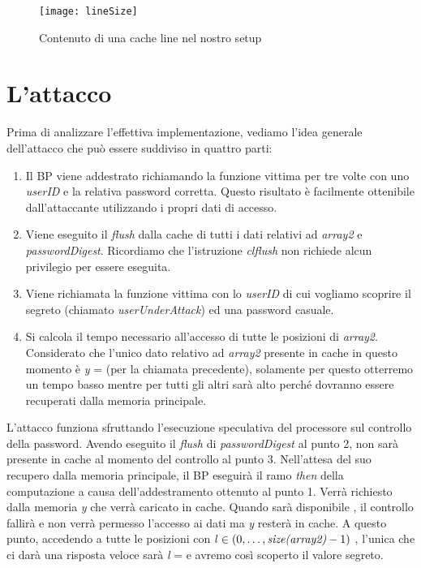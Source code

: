 		\begin{figure}
			\begin{center}
				\texttt{[image: lineSize]}
				\caption{Contenuto di una cache line nel nostro setup}
				\label{fig:lineSize}
			\end{center}
		\end{figure}
		
		\section{L'attacco}
			Prima di analizzare l'effettiva implementazione, vediamo l'idea generale dell'attacco che può essere suddiviso in quattro parti:
			
			\begin{enumerate}
				\item Il \ac{BP} viene addestrato richiamando la funzione vittima per tre volte con uno \emph{userID} e la relativa password corretta. Questo risultato è facilmente ottenibile dall'attaccante utilizzando i propri dati di accesso.
				\item Viene eseguito il \emph{flush} dalla cache di tutti i dati relativi ad \emph{array2} e \emph{passwordDigest}. Ricordiamo che l'istruzione \emph{clflush} non richiede alcun privilegio per essere eseguita.
				\item Viene richiamata la funzione vittima con lo \emph{userID} di cui vogliamo scoprire il segreto (chiamato \emph{userUnderAttack}) ed una password casuale.
				\item Si calcola il tempo necessario all'accesso di tutte le posizioni di \emph{array2}. Considerato che l'unico dato relativo ad \emph{array2} presente in cache in questo momento è \emph{y} =  (per la chiamata precedente), solamente per questo otterremo un tempo basso mentre per tutti gli altri sarà alto perché dovranno essere recuperati dalla memoria principale.
			\end{enumerate}
		
			L'attacco funziona sfruttando l'esecuzione speculativa del processore sul controllo della password. Avendo eseguito il \emph{flush} di \emph{passwordDigest} al punto 2,  non sarà presente in cache al momento del controllo al punto 3. Nell'attesa del suo recupero dalla memoria principale, il \ac{BP} eseguirà il ramo \emph{then} della computazione a causa dell'addestramento ottenuto al punto 1. Verrà richiesto dalla memoria \emph{y} che verrà caricato in cache. Quando sarà disponibile , il controllo fallirà e non verrà permesso l'accesso ai dati ma \emph{y} resterà in cache. A questo punto, accedendo a tutte le posizioni  con \emph{l} $\in (0,\dots,\text{\emph{size(array2)}}-1)$ , l'unica che ci darà una risposta veloce sarà \emph{l} =  e avremo così scoperto il valore segreto.
			
